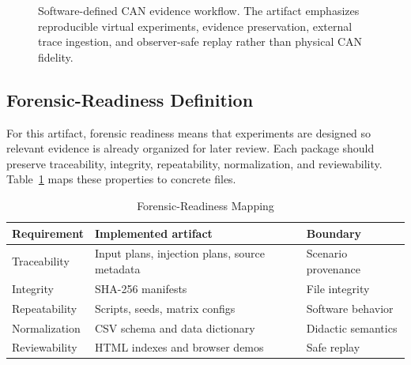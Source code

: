 \documentclass[conference]{IEEEtran}
\begin{document}
\begin{figure}[t]
\centering
{}
\caption{Software-defined CAN evidence workflow. The artifact emphasizes reproducible virtual experiments, evidence preservation, external trace ingestion, and observer-safe replay rather than physical CAN fidelity.}
\label{fig:pipeline}
\end{figure}

\subsection{Forensic-Readiness Definition}
For this artifact, forensic readiness means that experiments are designed so relevant evidence is already organized for later review. Each package should preserve traceability, integrity, repeatability, normalization, and reviewability. Table~\ref{tab:forensic} maps these properties to concrete files.

\begin{table}[t]
\caption{Forensic-Readiness Mapping}
\label{tab:forensic}
\centering
\footnotesize
\begin{tabular}{p{}p{}p{}}
\toprule
Requirement & Implemented artifact & Boundary \\
\midrule
Traceability & Input plans, injection plans, source metadata & Scenario provenance \\
Integrity & SHA-256 manifests & File integrity \\
Repeatability & Scripts, seeds, matrix configs & Software behavior \\
Normalization & CSV schema and data dictionary & Didactic semantics \\
Reviewability & HTML indexes and browser demos & Safe replay \\
\bottomrule
\end{tabular}
\end{table}
\end{document}
